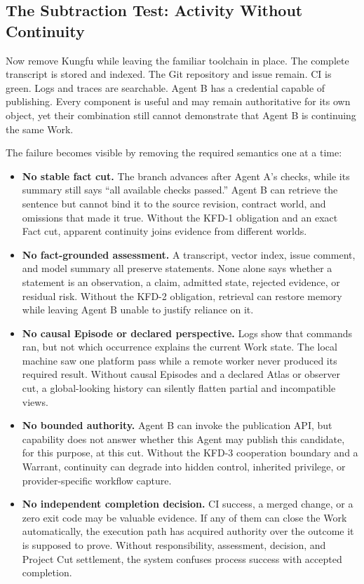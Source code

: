 \subsection{The Subtraction Test: Activity Without Continuity}

Now remove Kungfu while leaving the familiar toolchain in place. The complete
transcript is stored and indexed. The Git repository and issue remain. CI is
green. Logs and traces are searchable. Agent B has a credential capable of
publishing. Every component is useful and may remain authoritative for its own
object, yet their combination still cannot demonstrate that Agent B is
continuing the same Work.

The failure becomes visible by removing the required semantics one at a time:

\begin{itemize}[leftmargin=*]
  \item \textbf{No stable fact cut.}
    The branch advances after Agent A's checks, while its summary still says
    ``all available checks passed.'' Agent B can retrieve the sentence but
    cannot bind it to the source revision, contract world, and omissions that
    made it true. Without the KFD-1 obligation and an exact Fact cut, apparent
    continuity joins evidence from different worlds.

  \item \textbf{No fact-grounded assessment.}
    A transcript, vector index, issue comment, and model summary all preserve
    statements. None alone says whether a statement is an observation, a
    claim, admitted state, rejected evidence, or residual risk. Without the
    KFD-2 obligation, retrieval can restore memory while leaving Agent B unable
    to justify reliance on it.

  \item \textbf{No causal Episode or declared perspective.}
    Logs show that commands ran, but not which occurrence explains the current
    Work state. The local machine saw one platform pass while a remote worker
    never produced its required result. Without causal Episodes and a declared
    Atlas or observer cut, a global-looking history can silently flatten
    partial and incompatible views.

  \item \textbf{No bounded authority.}
    Agent B can invoke the publication API, but capability does not answer
    whether this Agent may publish this candidate, for this purpose, at this
    cut. Without the KFD-3 cooperation boundary and a Warrant, continuity can
    degrade into hidden control, inherited privilege, or provider-specific
    workflow capture.

  \item \textbf{No independent completion decision.}
    CI success, a merged change, or a zero exit code may be valuable evidence.
    If any of them can close the Work automatically, the execution path has
    acquired authority over the outcome it is supposed to prove. Without
    responsibility, assessment, decision, and Project Cut settlement, the
    system confuses process success with accepted completion.
\end{itemize}

